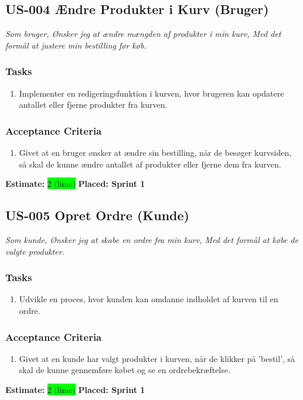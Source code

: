 \subsection{US-004 Ændre Produkter i Kurv (Bruger)}
\label{sec:US-004}
\textit{Som bruger, Ønsker jeg at ændre mængden af produkter i min kurv, Med det formål at justere min bestilling før køb.}
\subsubsection*{\textbf{Tasks}}
\begin{enumerate}
  \item Implementer en redigeringsfunktion i kurven, hvor brugeren kan opdatere antallet eller fjerne produkter fra kurven.
\end{enumerate}
\subsubsection*{\textbf{Acceptance Criteria}}
\begin{enumerate}
  \item Givet at en bruger ønsker at ændre sin bestilling, når de besøger kurvsiden, så skal de kunne ændre antallet af produkter eller fjerne dem fra kurven.
\end{enumerate}
\textbf{Estimate:} \colorbox{lime}{2 (lime)}
\textbf{Placed: Sprint 1}
\par\noindent\dotfill

\subsection{US-005 Opret Ordre (Kunde)}
\label{sec:US-005}
\textit{Som kunde, Ønsker jeg at skabe en ordre fra min kurv, Med det formål at købe de valgte produkter.}
\subsubsection*{\textbf{Tasks}}
\begin{enumerate}
  \item Udvikle en proces, hvor kunden kan omdanne indholdet af kurven til en ordre.
\end{enumerate}
\subsubsection*{\textbf{Acceptance Criteria}}
\begin{enumerate}
  \item Givet at en kunde har valgt produkter i kurven, når de klikker på 'bestil', så skal de kunne gennemføre købet og se en ordrebekræftelse.
\end{enumerate}
\textbf{Estimate:} \colorbox{lime}{2 (lime)}
\textbf{Placed: Sprint 1}
\par\noindent\dotfill

